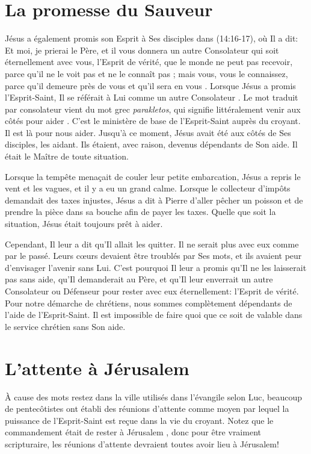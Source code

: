 \section*{La promesse du Sauveur}

Jésus a également promis son Esprit à Ses disciples dans
 (14:16-17), où Il a dit\space:
 \og Et moi, je prierai le Père, et il vous donnera un autre Consolateur
 qui soit éternellement avec vous, l'Esprit de vérité, que le monde ne peut
 pas recevoir, parce qu'il ne le voit pas et ne le connaît pas ; mais vous,
 vous le connaissez, parce qu'il demeure près de vous et qu'il sera en vous \fg{}.
 Lorsque Jésus a promis l'Esprit-Saint, Il se référait à Lui comme
 \og un autre Consolateur \fg{}.
 Le mot traduit par consolateur vient du mot grec \emph{parakletos},
 qui signifie littéralement \og venir aux côtés pour aider \fg{}.
 C'est le ministère de base de l'Esprit-Saint auprès du croyant.
 Il est là pour nous aider. Jusqu'à ce moment, Jésus avait été aux côtés
 de Ses disciples, les aidant. Ils étaient, avec raison, devenus dépendants
 de Son aide. Il était le Maître de toute situation.

Lorsque la tempête menaçait de couler leur petite embarcation, Jésus
 a repris le vent et les vagues, et il y a eu un grand calme.
 Lorsque le collecteur d'impôts demandait des taxes injustes,
 Jésus a dit à Pierre d'aller pêcher un poisson et de prendre
 la pièce dans sa bouche afin de payer les taxes.
 Quelle que soit la situation, Jésus était toujours prêt à aider.

Cependant, Il leur a dit qu'Il allait les quitter.
 Il ne serait plus avec eux comme par le passé.
 Leurs cœurs devaient être troublés par Ses mots,
 et ils avaient peur d'envisager l'avenir sans Lui.
 C'est pourquoi Il leur a promis qu'Il ne les laisserait pas sans aide,
 qu'Il demanderait au Père, et qu'Il leur enverrait un autre Consolateur
 ou Défenseur pour rester avec eux éternellement\space:
 l'Esprit de vérité.
 Pour notre démarche de chrétiens, nous sommes complètement dépendants de
 l'aide de l'Esprit-Saint.
 Il est impossible de faire quoi que ce soit de valable dans le service
 chrétien sans Son aide.

\section*{L'attente à Jérusalem}

À cause des mots \og restez dans la ville \fg{} utilisés dans
 l'évangile selon Luc, beaucoup de pentecôtistes ont établi des \og réunions
 d'attente \fg{} comme moyen par lequel la puissance de l'Esprit-Saint est
 reçue dans la vie du croyant. Notez que le commandement était de \og rester
 à Jérusalem \fg{} ,
 donc pour être vraiment scripturaire, les réunions d'attente devraient toutes
 avoir lieu à Jérusalem!

